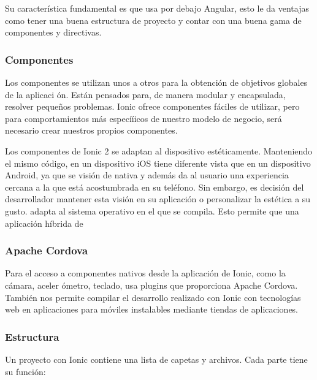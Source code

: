 \documentclass[a4paper, 12pt]{book}
\begin{document}
Su caracter\'istica fundamental es que usa por debajo Angular, esto le da ventajas como tener
una buena estructura de proyecto y contar con una buena gama de componentes y directivas.

\subsubsection{Componentes}
\label{subsec:estilo}

Los componentes se utilizan unos a otros para la obtenci\'on de objetivos globales de la aplicaci
\'on. Est\'an pensados para, de manera modular y encapsulada, resolver peque\~nos problemas.
Ionic ofrece componentes f\'aciles de utilizar, pero para comportamientos m\'as espec\'i\'iicos de
nuestro modelo de negocio, ser\'a necesario crear nuestros propios componentes.

Los componentes de Ionic 2 se adaptan al dispositivo est\'eticamente. Manteniendo el mismo
c\'odigo, en un dispositivo iOS tiene diferente vista que en un dispositivo Android, ya que se
visi\'on de nativa y adem\'as da al usuario una experiencia cercana a la que est\'a acostumbrada en
su tel\'efono. Sin embargo, es decisi\'on del desarrollador mantener esta visi\'on en su aplicaci\'on o
personalizar la est\'etica a su gusto.
adapta al sistema operativo en el que se compila. Esto permite que una aplicaci\'on h\'ibrida de

\subsubsection{Apache Cordova}
\label{subsec:estilo}

Para el acceso a componentes nativos desde la aplicaci\'on de Ionic, como la c\'amara, aceler
\'ometro, teclado, usa plugins que proporciona Apache Cordova. Tambi\'en nos permite compilar
el desarrollo realizado con Ionic con tecnolog\'ias web en aplicaciones para m\'oviles instalables
mediante tiendas de aplicaciones.

\subsubsection{Estructura}
\label{subsec:estilo}

Un proyecto con Ionic contiene una lista de capetas y archivos. Cada parte tiene su funci\'on:
\end{document}

